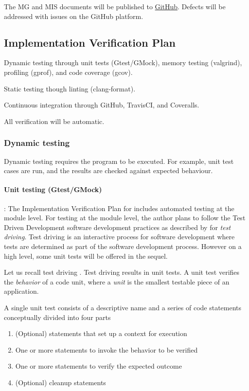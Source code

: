 \documentclass[12pt, titlepage]{article}
\begin{document}
The MG and MIS documents will be published to \href{https://github.com/JohnErnsthausen/roc}{GitHub}.
Defects will be addressed with issues on the GitHub platform.

\subsection{Implementation Verification Plan}

Dynamic testing through unit tests (Gtest/GMock), memory testing (valgrind), profiling (gprof),
and code coverage (gcov).

Static testing though linting (clang-format).

Continuous integration through GitHub, TravisCI, and Coveralls.

All verification will be automatic.

\subsubsection{Dynamic testing}
Dynamic testing requires the program to be executed. For example, unit test cases
are run, and the results are checked against expected behaviour.

\paragraph{Unit testing (Gtest/GMock)}:
The Implementation Verification Plan for  includes automated testing at the module level.
For testing at the module level, the author plans to follow the Test Driven Development
software development practices as described by \cite{langr2013} for {\it test driving}.
Test driving is an interactive process for software development where tests are determined
as part of the software development process. However on a high level, some unit tests
will be offered in the sequel.

Let us recall test driving \cite{langr2013}.
Test driving results in unit tests. A unit test verifies the {\it behavior} of a code unit,
where a {\it unit} is the smallest testable piece of an application.

A single unit test consists of a descriptive name and a series of code statements conceptually
divided into four parts

\begin{enumerate}
  \item (Optional) statements that set up a context for execution
  \item One or more statements to invoke the behavior to be verified
  \item One or more statements to verify the expected outcome
  \item (Optional) cleanup statements
\end{enumerate}
\end{document}
